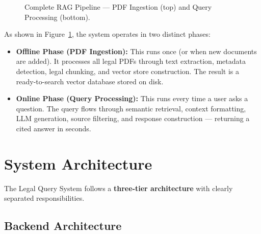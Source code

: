 \documentclass[12pt,a4paper]{article}
\begin{document}
\begin{figure}[H]
\caption{Complete RAG Pipeline --- PDF Ingestion (top) and Query Processing (bottom).}
\label{fig:rag-flowchart}
\end{figure}

As shown in Figure~\ref{fig:rag-flowchart}, the system operates in two distinct phases:

\begin{itemize}
  \item \textbf{Offline Phase (PDF Ingestion):} This runs once (or when new documents are added). It processes all legal PDFs through text extraction, metadata detection, legal chunking, and vector store construction. The result is a ready-to-search vector database stored on disk.
  \item \textbf{Online Phase (Query Processing):} This runs every time a user asks a question. The query flows through semantic retrieval, context formatting, LLM generation, source filtering, and response construction --- returning a cited answer in seconds.
\end{itemize}

\section{System Architecture}

The Legal Query System follows a \textbf{three-tier architecture} with clearly separated responsibilities.

\subsection{Backend Architecture}
\end{document}
